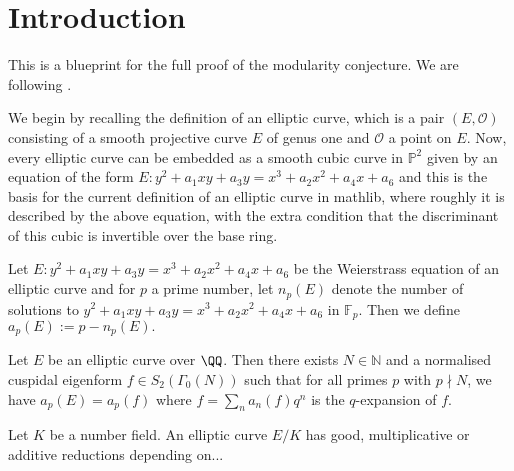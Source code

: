 \maketitle
\tableofcontents
\section{Introduction}


This is a blueprint for the full proof of the modularity conjecture. We are following \cite{cornell2013modular}.

 We begin by recalling the definition of an elliptic curve, which is a pair $(E,\mathcal{O})$ consisting of a smooth projective curve $E$ of genus one and $\mathcal{O}$ a point on $E$. Now, every elliptic curve can be embedded as a smooth cubic curve in $\mathbb{P}^2$ given by an equation of the form $E  : y^2+ a_1 xy+a_3y=x^3+a_2x^2+a_4x+a_6$ and this is the basis for the current definition of an elliptic curve in mathlib, where roughly it is described by the above equation, with the extra condition that the discriminant of this cubic is invertible over the base ring.

\begin{definition}\label{defn:Ell_curve_ap}
	Let $E : y^2+ a_1 xy+a_3y=x^3+a_2x^2+a_4x+a_6$ be the Weierstrass equation of an elliptic curve and for $p$ a prime number, let $n_p(E)$ denote the number of solutions to $y^2+ a_1 xy+a_3y=x^3+a_2x^2+a_4x+a_6$ in $\mathbb{F}_p$. Then we define $a_p(E):= p- n_p(E).$
\end{definition}



	\begin{theorem}
	\label{thm:mod_conj_ap}
	\leanok
	
	Let $E$ be an elliptic curve over $\QQ$. Then there exists $N \in \mathbb{N}$ and a normalised cuspidal eigenform $f \in S_{2}(\Gamma_0(N))$ such that for all primes $p$ with $p \nmid N$, we have $a_p(E)=a_p(f)$ where $f= \sum_n a_n(f)q^n$ is the $q$-expansion of $f$.
\end{theorem}

\begin{definition}\label{defn:ell_curve_reds}
	Let $K$ be a number field. An elliptic curve $E/K$ has good, multiplicative or additive reductions depending on...
\end{definition}

